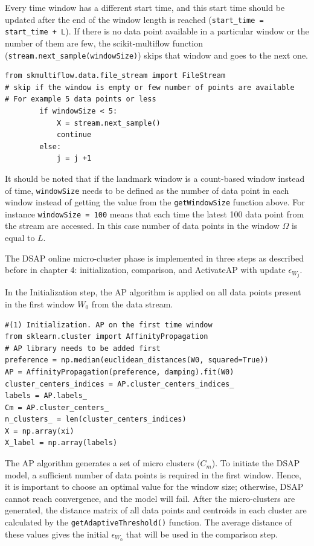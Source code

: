 Every time window has a different start time, and this start time should be updated after the end of the window length is reached (\texttt{start\_time = start\_time + L}). If there is no data point available in a particular window or the number of them are few, the scikit-multiflow function (\texttt{stream.next\_sample(windowSize)}) skips that window and goes to the next one.

\begin{lstlisting}
from skmultiflow.data.file_stream import FileStream
# skip if the window is empty or few number of points are available
# For example 5 data points or less 
        if windowSize < 5:
            X = stream.next_sample()
            continue
        else:    
            j = j +1
\end{lstlisting}


It should be noted that if the landmark window is a count-based window instead of time, \texttt{windowSize} needs to be defined as the number of data point in each window instead of getting the value from the \texttt{getWindowSize} function above. For instance \texttt{windowSize = 100} means that each time the latest 100 data point from the stream are accessed. In this case number of data points in the window $\Omega$ is equal to $L$.

The DSAP online micro-cluster phase is implemented in three steps as described before in chapter 4: initialization, comparison, and ActivateAP with update $\epsilon_{W_j}$.

In the Initialization step, the AP algorithm is applied on all data points present in the first window $W_0$ from the data stream. %

\begin{lstlisting}
#(1) Initialization. AP on the first time window
from sklearn.cluster import AffinityPropagation 
# AP library needs to be added first
preference = np.median(euclidean_distances(W0, squared=True))
AP = AffinityPropagation(preference, damping).fit(W0)
cluster_centers_indices = AP.cluster_centers_indices_
labels = AP.labels_
Cm = AP.cluster_centers_
n_clusters_ = len(cluster_centers_indices)
X = np.array(xi)
X_label = np.array(labels)
\end{lstlisting}

The AP algorithm generates a set of micro clusters ($C{_m}$). To initiate the DSAP model, a sufficient number of data points is required in the first window. Hence, it is important to choose an optimal value for the window size; otherwise, DSAP cannot reach convergence, and the model will fail. After the micro-clusters are generated, the distance matrix of all data points and centroids in each cluster are calculated by the \texttt{getAdaptiveThreshold()} function. The average distance of these values gives the initial $\epsilon_{W_0}$ that will be used in the comparison step.



